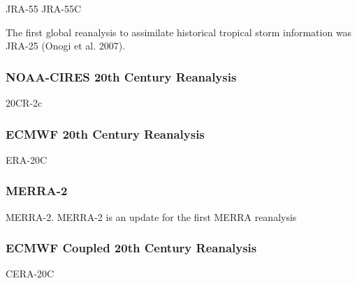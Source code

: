 \documentclass{ametsoc}
\begin{document}
JRA-55 \citep{Kobayashi2015, Harada2016}
JRA-55C


The first global reanalysis to assimilate historical tropical storm information was JRA-25 (Onogi et al.
2007).

\subsubsection{NOAA-CIRES 20th Century Reanalysis}

20CR-2c \citep{Compo2011}





\subsubsection{ECMWF 20th Century Reanalysis}

ERA-20C \citep{Poli2016}





\subsubsection{MERRA-2}

\cite{Gelaro2017}
MERRA-2. MERRA-2 is an update for the first MERRA reanalysis \citep{Rienecker2011}





\subsubsection{ECMWF Coupled 20th Century Reanalysis}

CERA-20C






\end{document}
